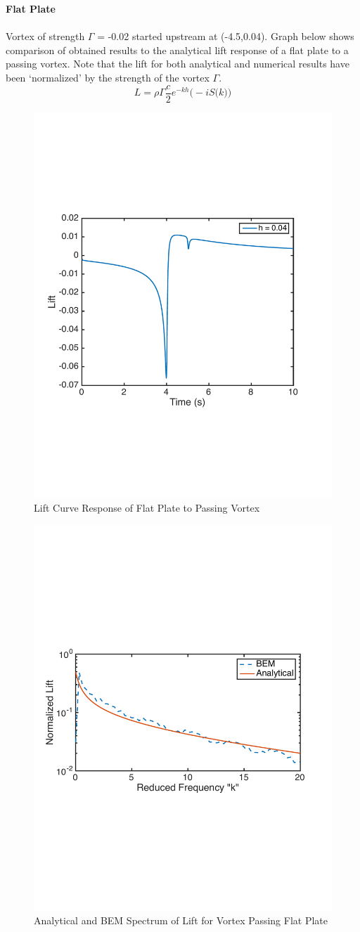 \documentclass{article}
\begin{document}
\noindent \textbf{Flat Plate} \\ \\
Vortex of strength $\Gamma$ = -0.02 started upstream at (-4.5,0.04). Graph below shows comparison of obtained results to the analytical lift response of a flat plate to a passing vortex. Note that the lift for both analytical and numerical results have been `normalized' by the strength of the vortex $\Gamma$.\\
\begin{equation}
L = \rho \Gamma \frac{c}{2} e^{-kh} \big(-i S\big(k \big) \big)
\end{equation}

\begin{figure}[h]
\includegraphics[width = 4 in, height = 3 in]{Lift_Curve}
\centering
\caption{Lift Curve Response of Flat Plate to Passing Vortex}
\end{figure}

\begin{figure}[h]
\includegraphics[width = 4 in, height = 3 in]{SearsVsBEM}
\centering
\caption{Analytical and BEM Spectrum of Lift for Vortex Passing Flat Plate}
\end{figure}
\newpage
\end{document}
